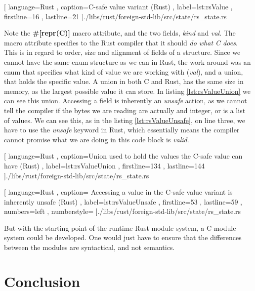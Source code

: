 \begin{code}[H]
  
    [ language=Rust
    , caption={C-safe value variant (Rust)}
    , label=lst:rsValue
    , firstline=16
    , lastline=21
    ]{./libs/rust/foreign-std-lib/src/state/rs\_state.rs}
\end{code}

Note the \textbf{\#[repr(C)]} macro attribute, and the two fields,
\textit{kind} and \textit{val}. The macro attribute specifies to the Rust
compiler that it should \textit{do what C does}. This is in regard to order,
size and alignment of fields of a structure. Since we cannot have the same enum
structure as we can in Rust, the work-around was an enum that specifies what
kind of value we are working with (\textit{val}), and a union, that holds the
specific value. A union in both C and Rust, has the same size in memory, as the
largest possible value it can store. In listing \ref{lst:rsValueUnion} we can
see this union. Accessing a field is inherently an \textit{unsafe} action, as we
cannot tell the compiler if the bytes we are reading are actually and integer,
or is a list of values. We can see this, as in the listing
\ref{lst:rsValueUnsafe}, on line three, we have to use the \textit{unsafe}
keyword in Rust, which essentially means the compiler cannot promise what we are
doing in this code block is \textit{valid}.

\begin{code}
  
    [ language=Rust
    , caption={Union used to hold the values the C-safe value can have (Rust)}
    , label=lst:rsValueUnion
    , firstline=134
    , lastline=144
    ]{./libs/rust/foreign-std-lib/src/state/rs\_state.rs}
\end{code}

\begin{code}
  
    [ language=Rust
    , caption={
      Accessing a value in the C-safe value variant is inherently unsafe (Rust)
    }
    , label=lst:rsValueUnsafe
    , firstline=53
    , lastline=59
    , numbers=left
    , numberstyle=\tiny\color{gray}
    ]{./libs/rust/foreign-std-lib/src/state/rs\_state.rs}
\end{code}

But with the starting point of the runtime Rust module system, a C module system
could be developed. One would just have to ensure that the differences between
the modules are syntactical, and not semantics.


\section{Conclusion} \label{sec:conclusion}

